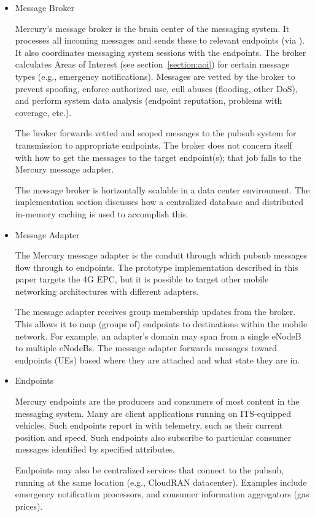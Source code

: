 \begin{itemize}
{\bf Discuss how Mercury integrates with the pubsub.}

\item Message Broker

Mercury's message broker is the brain center of the messaging
system. It processes all incoming messages and sends these to relevant
endpoints (via \pubsub). It also coordinates messaging system sessions
with the endpoints. The broker calculates Areas of Interest (see
section~\ref{section:aoi}) for certain message types (e.g., emergency
notifications).  Messages are vetted by the broker to prevent
spoofing, enforce authorized use, cull abuses (flooding, other DoS),
and perform system data analysis (endpoint reputation, problems with
coverage, etc.).

The broker forwards vetted and scoped messages to the pubsub system
for transmission to appropriate endpoints.  The broker does not
concern itself with how to get the messages to the target endpoint(s);
that job falls to the Mercury message adapter.

The message broker is horizontally scalable in a data center
environment. The implementation section discusses how a centralized
database and distributed in-memory caching is used to accomplish this.

\item Message Adapter

The Mercury message adapter is the conduit through which pubsub
messages flow through to endpoints. The prototype implementation
described in this paper targets the 4G EPC, but it is possible to
target other mobile networking architectures with different adapters.

The message adapter receives group membership updates from the
broker. This allows it to map (groups of) endpoints to destinations
within the mobile network.  For example, an adapter's domain may span
from a single eNodeB to multiple eNodeBs.  The message adapter
forwards messages toward endpoints (UEs) based where they are attached
and what state they are in.

\item Endpoints

Mercury endpoints are the producers and consumers of most content in
the messaging system. Many are client applications running on
ITS-equipped vehicles.  Such endpoints report in with telemetry, such
as their current position and speed.  Such endpoints also subscribe to
particular consumer messages identified by specified attributes.

Endpoints may also be centralized services that connect to the pubsub,
running at the same location (e.g., CloudRAN datacenter). Examples
include emergency notification processors, and consumer information
aggregators (gas prices).

\end{itemize}

